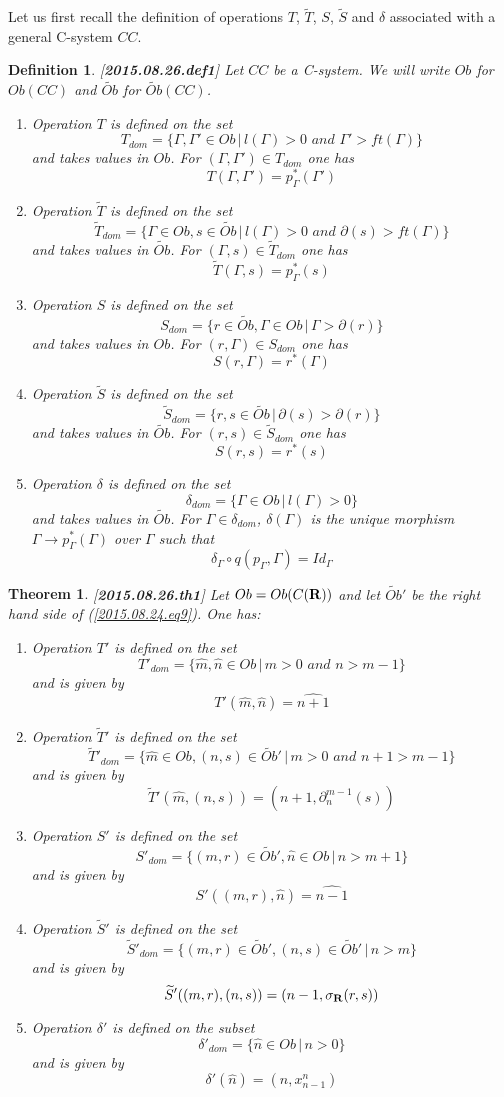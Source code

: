 \documentclass[11pt]{article}
\newtheorem{definition}[proposition]{Definition}
\newtheorem{theorem}[proposition]{Theorem}
\newcommand{\llabel}[1]{\label{#1}[{\bf #1}]}
\newcommand{\sr}{\rightarrow}
\newcommand{\rr}{{\bf R}}
\newcommand{\wt}{\widetilde}
\newcommand{\wh}{\widehat}
\begin{document}
Let us first recall the definition of operations $T$, $\wt{T}$, $S$, $\wt{S}$ and $\delta$ associated with a general C-system $CC$. 
%
\begin{definition}
\llabel{2015.08.26.def1}
Let $CC$ be a C-system. We will write $Ob$ for $Ob(CC)$ and $\wt{Ob}$ for $\wt{Ob}(CC)$. 
%
%
\begin{enumerate}
\item Operation $T$ is defined on the set
%
$$T_{dom}=\{\Gamma,\Gamma'\in Ob\,|\,l(\Gamma)>0\,\,and\,\, \Gamma'>ft(\Gamma)\}$$
%
and takes values in $Ob$. For $(\Gamma,\Gamma')\in T_{dom}$ one has
%
$$T(\Gamma,\Gamma')=p_{\Gamma}^*(\Gamma')$$
%
\item Operation $\wt{T}$ is defined on the set
%
$$\wt{T}_{dom}=\{\Gamma\in Ob, s\in \wt{Ob}\,|\,l(\Gamma)>0\,\,and\,\, \partial(s)>ft(\Gamma)\}$$
%
and takes values in $\wt{Ob}$. For $(\Gamma,s)\in \wt{T}_{dom}$ one has
%
$$\wt{T}(\Gamma,s)=p_{\Gamma}^*(s)$$
%
\item Operation $S$ is defined on the set
%
$$S_{dom}=\{r\in \wt{Ob}, \Gamma\in Ob\,|\,\Gamma>\partial(r)\}$$
%
and takes values in $Ob$. For $(r,\Gamma)\in S_{dom}$ one has
%
$$S(r,\Gamma)=r^*(\Gamma)$$
%
\item Operation $\wt{S}$ is defined on the set 
%
$$\wt{S}_{dom}=\{r,s\in \wt{Ob}\,|\,\partial(s)>\partial(r)\}$$
%
and takes values in $\wt{Ob}$. For $(r,s)\in \wt{S}_{dom}$ one has
%
$$S(r,s)=r^*(s)$$
%
\item Operation $\delta$ is defined on the set 
%
$$\delta_{dom}=\{\Gamma\in Ob\,|\,l(\Gamma)>0\}$$
%
and takes values in $\wt{Ob}$. For $\Gamma\in \delta_{dom}$, $\delta(\Gamma)$ is the unique morphism $\Gamma\sr p_{\Gamma}^*(\Gamma)$ over $\Gamma$ such that 
%
$$\delta_{\Gamma}\circ q(p_{\Gamma},\Gamma)=Id_{\Gamma}$$
%
\end{enumerate}
\end{definition}
%
\begin{theorem}
\llabel{2015.08.26.th1}
Let $Ob=Ob(C(\rr))$ and let $\wt{Ob}'$ be the right hand side of (\ref{2015.08.24.eq9}). One has:
%
\begin{enumerate}
\item Operation $T'$ is defined on the set
%
$$T'_{dom}=\{\wh{m},\wh{n}\in Ob\,|\,m>0\,\,and\,\,n>m-1\}$$
%
and is given by 
%
$$T'(\wh{m},\wh{n})=\wh{n+1}$$
%
\item Operation $\wt{T}'$ is defined on the set 
%
$$\wt{T}'_{dom}=\{\wh{m}\in Ob, (n,s)\in \wt{Ob}'\,|\,m>0\,\,and\,\,n+1>m-1\}$$
%
and is given by
%
$$\wt{T}'(\wh{m},(n,s))=(n+1,\partial_n^{m-1}(s))$$
%
\item Operation $S'$ is defined on the set
%
$$S'_{dom}=\{(m,r)\in \wt{Ob}',\wh{n}\in Ob\,|\,n>m+1\}$$
%
and is given by
%
$$S'((m,r),\wh{n})=\wh{n-1}$$
%
\item Operation $\wt{S}'$ is defined on the set 
%
$$\wt{S}'_{dom}=\{(m,r)\in\wt{Ob}',(n,s)\in \wt{Ob}'\,|\,n>m\}$$
%
and is given by
%
$$\wt{S}'((m,r),(n,s))=(n-1,\sigma_{\rr}(r,s))$$
%
\item Operation $\delta'$ is defined on the subset
%
$$\delta'_{dom}=\{\wh{n}\in Ob\,|\,n>0\}$$
%
and is given by
%
$$\delta'(\wh{n})=(n,x_{n-1}^n)$$
%
\end{enumerate}
\end{theorem}
\end{document}
